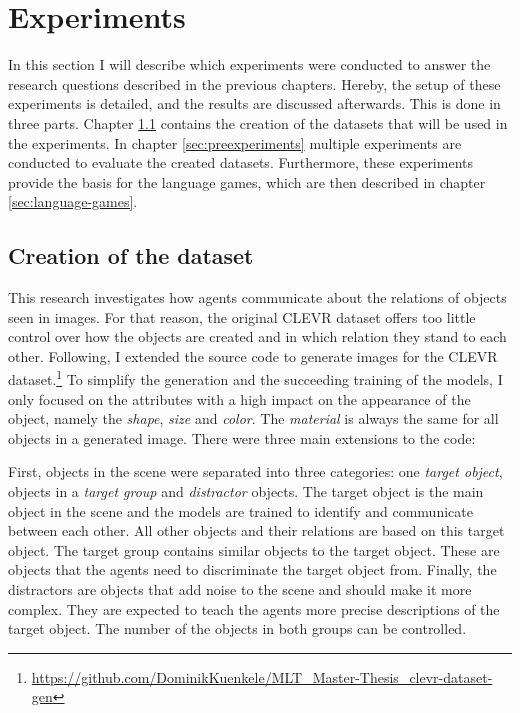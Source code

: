 \section{Experiments}
\label{sec:exp-setup}

In this section I will describe which experiments were conducted to answer the research questions described in the previous chapters.
Hereby, the setup of these experiments is detailed, and the results are discussed afterwards.
This is done in three parts.
Chapter \ref{sec:creation-dataset} contains the creation of the datasets that will be used in the experiments.
In chapter \ref{sec:preexperiments} multiple experiments are conducted to evaluate the created datasets.
Furthermore, these experiments provide the basis for the language games, which are then described in chapter \ref{sec:language-games}.


\subsection{Creation of the dataset}
\label{sec:creation-dataset}

This research investigates how agents communicate about the relations of objects seen in images.
For that reason, the original CLEVR dataset offers too little control over how the objects are created and in which relation they stand to each other.
Following, I extended the source code to generate images for the CLEVR dataset.\footnote{\href{https://github.com/DominikKuenkele/MLT\_Master-Thesis\_clevr-dataset-gen}{https://github.com/DominikKuenkele/MLT\_Master-Thesis\_clevr-dataset-gen}}
To simplify the generation and the succeeding training of the models, I only focused on the attributes with a high impact on the appearance of the object, namely the \emph{shape}, \emph{size} and \emph{color}.
The \emph{material} is always the same for all objects in a generated image.
There were three main extensions to the code:

First, objects in the scene were separated into three categories: one \emph{target object}, objects in a \emph{target group} and \emph{distractor} objects.
The target object is the main object in the scene and the models are trained to identify and communicate between each other.
All other objects and their relations are based on this target object.
The target group contains similar objects to the target object.
These are objects that the agents need to discriminate the target object from.
Finally, the distractors are objects that add noise to the scene and should make it more complex. They are expected to teach the agents more precise descriptions of the target object.
The number of the objects in both groups can be controlled.

